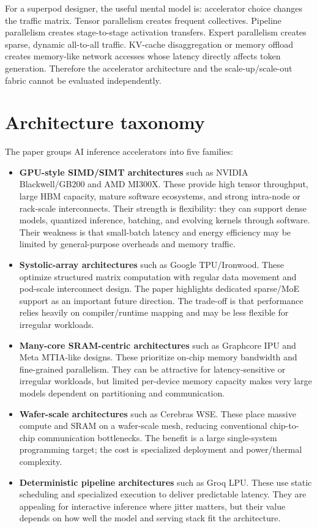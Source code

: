 \documentclass[10pt]{article}
\begin{document}
For a superpod designer, the useful mental model is: accelerator choice changes the traffic matrix. Tensor parallelism creates frequent collectives. Pipeline parallelism creates stage-to-stage activation transfers. Expert parallelism creates sparse, dynamic all-to-all traffic. KV-cache disaggregation or memory offload creates memory-like network accesses whose latency directly affects token generation. Therefore the accelerator architecture and the scale-up/scale-out fabric cannot be evaluated independently.

\section{Architecture taxonomy}
The paper groups AI inference accelerators into five families:

\begin{itemize}
  \item \textbf{GPU-style SIMD/SIMT architectures} such as NVIDIA Blackwell/GB200 and AMD MI300X. These provide high tensor throughput, large HBM capacity, mature software ecosystems, and strong intra-node or rack-scale interconnects. Their strength is flexibility: they can support dense models, quantized inference, batching, and evolving kernels through software. Their weakness is that small-batch latency and energy efficiency may be limited by general-purpose overheads and memory traffic.
  \item \textbf{Systolic-array architectures} such as Google TPU/Ironwood. These optimize structured matrix computation with regular data movement and pod-scale interconnect design. The paper highlights dedicated sparse/MoE support as an important future direction. The trade-off is that performance relies heavily on compiler/runtime mapping and may be less flexible for irregular workloads.
  \item \textbf{Many-core SRAM-centric architectures} such as Graphcore IPU and Meta MTIA-like designs. These prioritize on-chip memory bandwidth and fine-grained parallelism. They can be attractive for latency-sensitive or irregular workloads, but limited per-device memory capacity makes very large models dependent on partitioning and communication.
  \item \textbf{Wafer-scale architectures} such as Cerebras WSE. These place massive compute and SRAM on a wafer-scale mesh, reducing conventional chip-to-chip communication bottlenecks. The benefit is a large single-system programming target; the cost is specialized deployment and power/thermal complexity.
  \item \textbf{Deterministic pipeline architectures} such as Groq LPU. These use static scheduling and specialized execution to deliver predictable latency. They are appealing for interactive inference where jitter matters, but their value depends on how well the model and serving stack fit the architecture.
\end{itemize}
\end{document}
